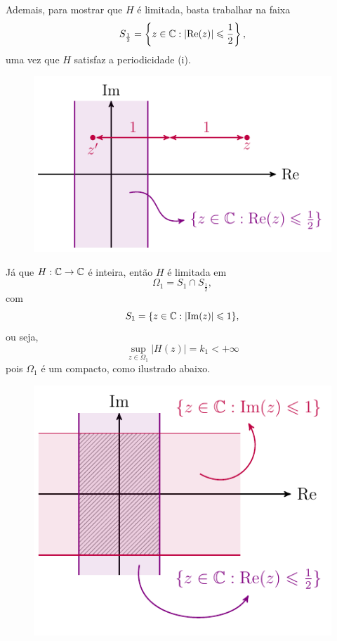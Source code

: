\begin{exemplo}
        Ademais, para mostrar que $H$ é limitada, basta trabalhar na faixa
        \begin{equation*}
            S_{\frac{1}{2}} = \left\{ z\in\mathbb{C} : |\mathrm{Re}(z)| \leqslant \frac{1}{2} \right\},
        \end{equation*}
        uma vez que $H$ satisfaz a periodicidade (i).
        \begin{figure}[H]\centering
            \includegraphics{Figuras/S_meio.pdf}
        \end{figure}
        Já que $H:\mathbb{C}\to\mathbb{C}$ é inteira, então $H$ é limitada em
        \begin{equation*}
            \Omega_1 = S_1 \cap S_{\frac{1}{2}},
        \end{equation*}
        com
        \begin{equation*}
            S_1 = \{ z\in\mathbb{C} : |\mathrm{Im}(z)| \leqslant 1 \},
        \end{equation*}
        ou seja, 
        \begin{equation}
            \sup_{z\in \Omega_1} |H(z)| = k_1 < +\infty
        \end{equation}
        pois $\Omega_1$ é um compacto, como ilustrado abaixo.
        \begin{figure}[H]\centering
            \includegraphics{Figuras/S_meio cap S_1.pdf}

\end{figure}
\end{exemplo}
